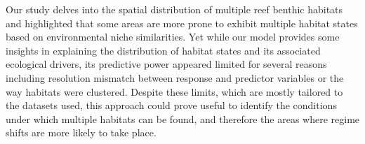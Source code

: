 \begin{refsection}
Our study delves into the spatial distribution of multiple reef benthic
habitats and highlighted that some areas are more prone to exhibit
multiple habitat states based on environmental niche similarities. Yet
while our model provides some insights in explaining the distribution of
habitat states and its associated ecological drivers, its predictive
power appeared limited for several reasons including resolution mismatch
between response and predictor variables or the way habitats were
clustered. Despite these limits, which are mostly tailored to the
datasets used, this approach could prove useful to identify the
conditions under which multiple habitats can be found, and therefore the
areas where regime shifts are more likely to take place.

\clearpage

\printbibliography[heading=subbibintoc, title={Bibliographie}]
\end{refsection}
